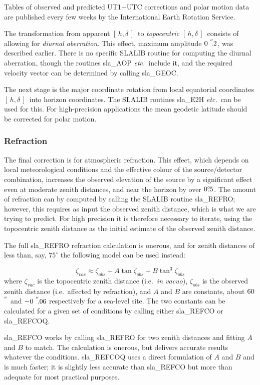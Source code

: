 \documentclass[11pt,twoside,nolof]{starlink}
\providecommand{\hadec}     {$[\,h,\delta\,]$}
\providecommand{\degree}[2] {$#1^{\circ}
                        \hspace{-0.37em}.\hspace{0.02em}#2$}
\providecommand{\arcsec}[2] {\arcseci{#1}$\hspace{-0.4em}.#2$}
\providecommand{\arcseci}[1] {$#1\hspace{-0.05em}$\raisebox{-0.5ex}
                         {$^{'\hspace{-0.1em}'}$}}
\begin{document}
Tables of observed and
predicted UT1$-$UTC corrections and polar motion data
are published every few weeks by the International Earth Rotation Service.

The transformation from apparent \hadec\ to \textit{topocentric}\/
\hadec\ consists of allowing for
\textit{diurnal aberration}.  This effect, maximum amplitude \arcsec{0}{2},
was described earlier.  There is no specific SLALIB routine
for computing the diurnal aberration,
though the routines
sla\_AOP \textit{etc.}\
include it, and the required velocity vector can be
determined by calling
sla\_GEOC.

The next stage is the major coordinate rotation from local equatorial
coordinates \hadec\ into horizon coordinates.  The SLALIB routines
sla\_E2H
\textit{etc.}\ can be used for this.  For high-precision
applications the mean geodetic latitude should be corrected for polar
motion.

\subsubsection{Refraction}
The final correction is for atmospheric refraction.
This effect, which depends on local meteorological conditions and
the effective colour of the source/detector combination,
increases the observed elevation of the source by a
significant effect even at moderate zenith distances, and near the
horizon by over \degree{0}{5}.  The amount of refraction can by
computed by calling the SLALIB routine
sla\_REFRO;
however,
this requires as input the observed zenith distance, which is what
we are trying to predict.  For high precision it is
therefore necessary to iterate, using the topocentric
zenith distance as the initial estimate of the
observed zenith distance.

The full
sla\_REFRO refraction calculation is onerous, and for
zenith distances of less than, say, $75^{\circ}$ the following
model can be used instead:

\[ \zeta _{vac} \approx \zeta _{obs}
                     + A \tan \zeta _{obs}
                     + B \tan ^{3}\zeta _{obs} \]
where $\zeta _{vac}$ is the topocentric
zenith distance (i.e.\ \textit{in vacuo}),
$\zeta _{obs}$ is the observed
zenith distance (i.e.\ affected by refraction), and $A$ and $B$ are
constants, about \arcseci{60}
and \arcsec{-0}{06} respectively for a sea-level site.
The two constants can be calculated for a given set of conditions
by calling either
sla\_REFCO or
sla\_REFCOQ.

sla\_REFCO works by calling
sla\_REFRO for two zenith distances and fitting $A$ and $B$
to match.  The calculation is onerous, but delivers accurate
results whatever the conditions.
sla\_REFCOQ uses a direct formulation of $A$ and $B$ and
is much faster;  it is slightly less accurate than
sla\_REFCO but more than adequate for most practical purposes.
\end{document}

